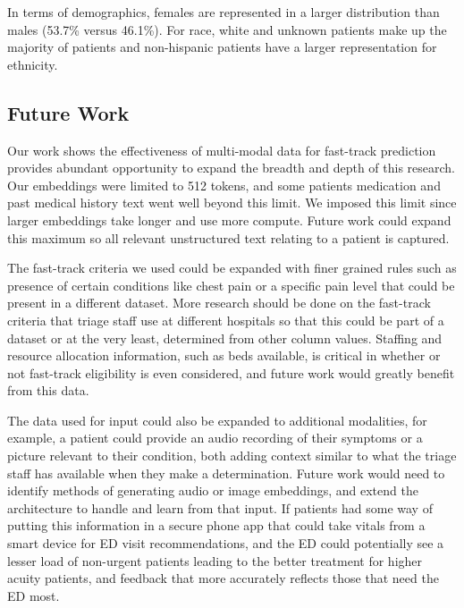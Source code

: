 \documentclass[sigconf]{acmart}
\begin{document}
In terms of demographics, females are represented in a larger distribution than males (53.7\% versus 46.1\%). For race, white and unknown patients make up the majority of patients and non-hispanic patients have a larger representation for ethnicity.


\subsection{Future Work}
Our work shows the effectiveness of multi-modal data for fast-track prediction provides abundant opportunity to expand the breadth and depth of this research. Our embeddings were limited to 512 tokens, and some patients medication and past medical history text went well beyond this limit. We imposed this limit since larger embeddings take longer and use more compute. Future work could expand this maximum so all relevant unstructured text relating to a patient is captured.

The fast-track criteria we used could be expanded with finer grained rules such as presence of certain conditions like chest pain or a specific pain level that could be present in a different dataset. More research should be done on the fast-track criteria that triage staff use at different hospitals so that this could be part of a dataset or at the very least, determined from other column values. Staffing and resource allocation information, such as beds available, is critical in whether or not fast-track eligibility is even considered, and future work would greatly benefit from this data.

The data used for input could also be expanded to additional modalities, for example, a patient could provide an audio recording of their symptoms or a picture relevant to their condition, both adding context similar to what the triage staff has available when they make a determination. Future work would need to identify methods of generating audio or image embeddings, and extend the architecture to handle and learn from that input. If patients had some way of putting this information in a secure phone app that could take vitals from a smart device for ED visit recommendations, and the ED could potentially see a lesser load of non-urgent patients leading to the better treatment for higher acuity patients, and feedback that more accurately reflects those that need the ED most. 
\end{document}
